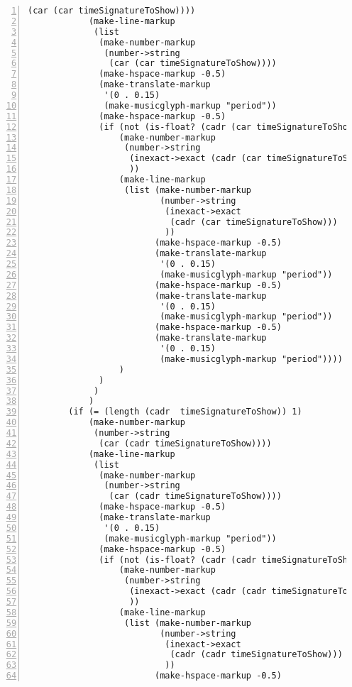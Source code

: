 \begin{Verbatim}[numbers=left,xleftmargin=5mm]
              (car (car timeSignatureToShow))))
            (make-line-markup
             (list
              (make-number-markup
               (number->string
                (car (car timeSignatureToShow))))
              (make-hspace-markup -0.5)
              (make-translate-markup
               '(0 . 0.15)
               (make-musicglyph-markup "period"))
              (make-hspace-markup -0.5)
              (if (not (is-float? (cadr (car timeSignatureToShow))))
                  (make-number-markup
                   (number->string
                    (inexact->exact (cadr (car timeSignatureToShow)))
                    ))
                  (make-line-markup
                   (list (make-number-markup
                          (number->string
                           (inexact->exact
                            (cadr (car timeSignatureToShow)))
                           ))
                         (make-hspace-markup -0.5)
                         (make-translate-markup
                          '(0 . 0.15)
                          (make-musicglyph-markup "period"))
                         (make-hspace-markup -0.5)
                         (make-translate-markup
                          '(0 . 0.15)
                          (make-musicglyph-markup "period"))
                         (make-hspace-markup -0.5)
                         (make-translate-markup
                          '(0 . 0.15)
                          (make-musicglyph-markup "period"))))
                  )
              )
             )
            )
        (if (= (length (cadr  timeSignatureToShow)) 1)
            (make-number-markup
             (number->string
              (car (cadr timeSignatureToShow))))
            (make-line-markup
             (list
              (make-number-markup
               (number->string
                (car (cadr timeSignatureToShow))))
              (make-hspace-markup -0.5)
              (make-translate-markup
               '(0 . 0.15)
               (make-musicglyph-markup "period"))
              (make-hspace-markup -0.5)
              (if (not (is-float? (cadr (cadr timeSignatureToShow))))
                  (make-number-markup
                   (number->string
                    (inexact->exact (cadr (cadr timeSignatureToShow)))
                    ))
                  (make-line-markup
                   (list (make-number-markup
                          (number->string
                           (inexact->exact
                            (cadr (cadr timeSignatureToShow)))
                           ))
                         (make-hspace-markup -0.5)

\end{Verbatim}
